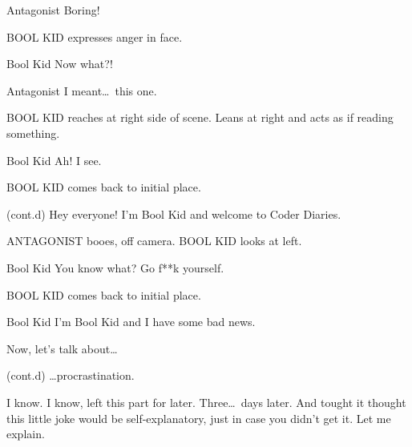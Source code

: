 \documentclass{screenplay}[2018/01/07]
\begin{document}
    \begin{dialogue}{Antagonist}
        Boring!
    \end{dialogue}

    BOOL KID expresses anger in face.

    \begin{dialogue}{Bool Kid}
        Now what?!
    \end{dialogue}

    \begin{dialogue}{Antagonist}
        I meant\dots\ this one.
    \end{dialogue}

    BOOL KID reaches at right side of scene. Leans at right and acts as if
    reading something.

    \begin{dialogue}{Bool Kid}
        Ah! I see.
    \end{dialogue}


    BOOL KID comes back to initial place.

    \begin{dialogue}{(cont.d)}
        Hey everyone! I'm Bool Kid and welcome to Coder Diaries.
    \end{dialogue}

    ANTAGONIST booes, off camera.
    BOOL KID looks at left.

    \begin{dialogue}[shouting]{Bool Kid}
        You know what? Go f**k yourself.
    \end{dialogue}

    BOOL KID comes back to initial place.

    \begin{dialogue}{Bool Kid}
        I'm Bool Kid and I have some bad news.

        Now, let's talk about\dots
    \end{dialogue}



    \begin{dialogue}{(cont.d)}
        \dots procrastination.

        I know. I know, left this part for later. Three\dots\ days later. And
        tought it thought this little joke would be self-explanatory, just in
        case you didn't get it. Let me explain.
    \end{dialogue}
\end{document}

